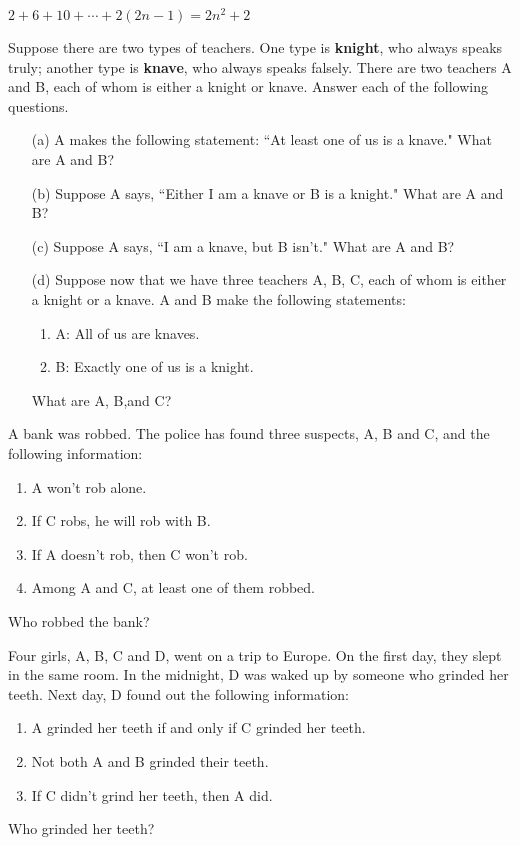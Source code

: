 \documentclass[11pt, oneside]{article}
\begin{document}
$2+6+10+\cdots+2(2n-1)=2n^2+2$


\begin{question}
Suppose there are two types of teachers. One type is \textbf{knight}, who always speaks truly; another type is \textbf{knave}, who always speaks falsely. There are two teachers A and B, each of whom is either a knight or knave. Answer each of the following questions.
\begin{itemize}
	\item[(a)] A makes the following statement: ``At least one of us is a knave." What are A and B?
	\item[(b)] Suppose A says, ``Either I am a knave or B is a knight." What are A and B?
	\item[(c)] Suppose A says, ``I am a knave, but B isn't." What are A and B?
	\item[(d)] Suppose now that we have three teachers A, B, C, each of whom is either a knight or a knave. A and B make the following statements:
	\begin{enumerate}
		\item A: All of us are knaves.
		\item B: Exactly one of us is a knight.
	\end{enumerate}
What are A, B,and C?
\end{itemize}
\end{question}
\begin{question}
 A bank was robbed. The police has found three suspects, A,
	B and C, and the following information:
	\begin{enumerate}
		\item A won't rob alone.
		\item	If C robs, he will rob with B.
		\item	If A doesn't rob, then C won't rob.
		\item	Among A and C, at least one of them robbed.
	\end{enumerate}
	Who robbed the bank?
\end{question}
\begin{question}
	Four girls, A, B, C and D, went on a trip to Europe. On
	the first day, they slept in the same room. In the midnight,
	D was waked up by someone who grinded her teeth.
	Next day, D found out the following information:
	\begin{enumerate}
		\item A grinded her teeth if and only if C grinded her teeth.
		\item  Not both A and B grinded their teeth.
		\item If C didn't grind her teeth, then A did.
	\end{enumerate}
Who grinded her teeth?
\end{question}
\end{document}
